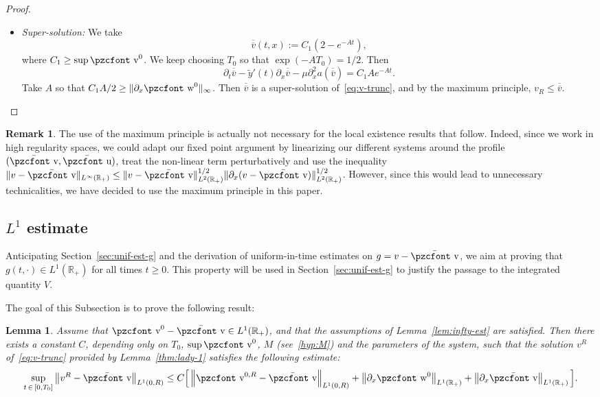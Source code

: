 \documentclass[10pt]{amsart}
\newtheorem{lemm}[theo]{Lemma}\newtheorem{prop}[theo]{Proposition}\newtheorem{coro}[theo]{Corollary}\newtheorem{conj}[theo]{Conjecture}
\theoremstyle{definition}\newtheorem{defi}[theo]{Definition}\newtheorem{rema}[theo]{Remark}\newtheorem{exam}[theo]{Example}\newtheorem{exem}[theo]{Example}\newtheorem{nota}[theo]{Notation}
\newcommand{\mathpzc}[1]{\text{\pzcfont #1}}
\newcommand{\R}{\mathbb{R}}
\newcommand{\p}{\partial}
\newcommand{\bv}{\bar{\mathpzc{v}}}
\newcommand{\bu}{\bar{\mathpzc{u}}}
\newcommand{\tv}{\mathpzc{v}}
\newcommand{\tw}{\mathpzc{w}}
\newcommand{\ty}{\widetilde{y}}
\newcommand{\bbv}{\overline{\overline{v}}}
\newcommand{\uuv}{\underline{\underline{v}}}
\begin{document}
\begin{proof}
\begin{itemize}
Note that by construction, we have $\uuv\leq v^R$ on the sets $\{t=0\}\cup\linebreak \{x=0\}\cup \{x=R\}$ provided $R$ is large enough.

Thus, by the maximum principle, $\uuv\leq v^R$.

\item \emph{Super-solution:} We take
\[
\bbv(t,x):= C_1\left(2 - e^{-At}\right),
\]
where $C_1\geq \sup \tv^0 $. We keep choosing $T_0$ so that $\exp(-AT_0)=1/2$. Then
\[
\partial_t \bbv - \ty'(t)\partial_x \bbv - \mu \partial^2_x a (\bbv)= C_1 A e^{-At}.
\]
Take $A$ so that $C_1 A/2\geq \|\p_x \tw^0\|_\infty$. Then $\bbv$ is a super-solution of~\eqref{eq:v-trunc}, and by the maximum principle, $v_R\leq \bbv$.
\end{itemize}
\end{proof}


\begin{rema}
The use of the maximum principle is actually not necessary for the local existence results that follow. Indeed, since we work in high regularity spaces, we could adapt our fixed point argument by linearizing our different systems around the profile $(\bv,\bu)$, treat the non-linear term perturbatively and use the inequality $\|v-\bv\|_{L^\infty(\R_+)} \leq \|v-\bv\|_{L^2(\R_+)}^{1/2} \|\partial_x(v -\bv)\|_{L^2(\R_+)}^{1/2}$. However, since this would lead to unnecessary technicalities, we have decided to use the maximum principle in this paper.
\end{rema}



\subsection{\texorpdfstring{$L^1$}{L1} estimate}

Anticipating Section~\ref{sec:unif-est-g} and the derivation of uniform-in-time estimates on $g = v-\bv$, we aim at proving that $g(t,\cdot) \in L^1(\R_+)$ for all times $t \geq 0$. This property will be used in Section~\ref{sec:unif-est-g} to justify the passage to the integrated quantity $V$.

The goal of this Subsection is to prove the following result:


\begin{lemm}\label{lem:L1-vR}
Assume that $\tv^0 -\bv \in L^1(\R_+)$, and that the assumptions of Lemma~\ref{lem:infty-est} are satisfied. Then there exists a constant $C$, depending only on $T_0$, $\sup \tv^0$, $M$ (see~\eqref{hyp:M}) and the parameters of the system, such that the solution $v^R$ of~\eqref{eq:v-trunc} provided by Lemma~\ref{thm:lady-1} satisfies the following estimate:
\begin{equation}\label{eq:L1-vR}
\sup_{t\,\in\,[0,T_0]} \left\|v^R - \bv\right\|_{L^1(0,R)}
\leq C \Big[\left\|\tv^{0,R} - \bv\right\|_{L^1(0,R)} + \left\|\partial_x \tw^0\right\|_{L^1(\R_+)} + \left\|\partial_x \bv\right\|_{L^1(\R_+)}\Big].
\end{equation}
\end{lemm}
\end{document}
